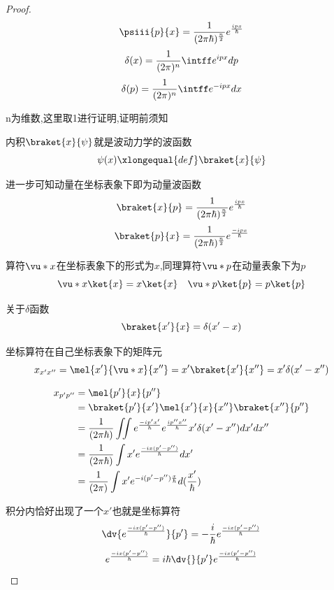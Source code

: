            \begin{proof}
                \pfindent

                $$ \psiii{p}{x} = \frac{1}{(2 \pi \hbar)^{\frac{n}{2}}} e^{\frac{ipx}{\hbar}} $$ 
                $$ \delta(x) = \frac{1}{(2\pi)^{n}} \intff e^{ipx} dp $$
                $$ \delta(p) = \frac{1}{(2\pi)^{n}} \intff e^{-ipx} dx $$

                n为维数,这里取1进行证明,证明前须知
                
                内积$\braket{x}{\psi}$就是波动力学的波函数
                $$\psi (x) \xlongequal{def} \braket{x}{\psi}$$
                
                进一步可知动量在坐标表象下即为动量波函数
                $$ \braket{x}{p} = \frac{1}{(2 \pi \hbar)^{\frac{n}{2}}} e^{\frac{ipx}{\hbar}} $$
                $$ \braket{p}{x} = \frac{1}{(2 \pi \hbar)^{\frac{n}{2}}} e^{\frac{-ipx}{\hbar}} $$

                算符$\vu*{x}$在坐标表象下的形式为$x$,同理算符$\vu*{p}$在动量表象下为$p$
                $${\vu*{x}} \ket{x}= x \ket{x} \quad {\vu*{p}} \ket{p} = p \ket{p} $$

                关于$\delta$函数
                $$ \braket{x'}{x} = \delta(x'-x) $$

                坐标算符在自己坐标表象下的矩阵元
                $$ x_{x'x''} = \mel{x'}{\vu*{x}}{x''} = x' \braket{x'}{x''} = x' \delta(x'-x'') $$

                \begin{align*}
                    x_{p'p''} &= \mel{p'}{x}{p''} \\
                            &= \braket{p'}{x'} \mel{x'}{x}{x''} \braket{x''}{p''}                                                                  \\
                            &= \frac{1}{(2 \pi \hbar)} \iint e^{\frac{-ip' x'}{\hbar}}  e^{\frac{ip''x''}{\hbar}} x' \delta(x'-x'') dx'dx''          \\
                            &= \frac{1}{(2 \pi \hbar)} \int x' e^{\frac{-ix(p'-p'')}{\hbar}}   dx'                                                   \\
                            &= \frac{1}{(2 \pi)} \int x' e^{-i(p'-p'')\frac{x}{\hbar}}   d(\frac{x'}{\hbar})
                \end{align*}

                积分内恰好出现了一个$x'$也就是坐标算符
                $$ \dv{e^{\frac{-ix(p'-p'')}{\hbar}}}{p'} = -\frac{i}{\hbar} e^{\frac{-ix(p'-p'')}{\hbar}}$$
                $$ e^{\frac{-ix(p'-p'')}{\hbar}} = i\hbar \dv{}{p'} e^{\frac{-ix(p'-p'')}{\hbar}}$$
                

\end{proof}
